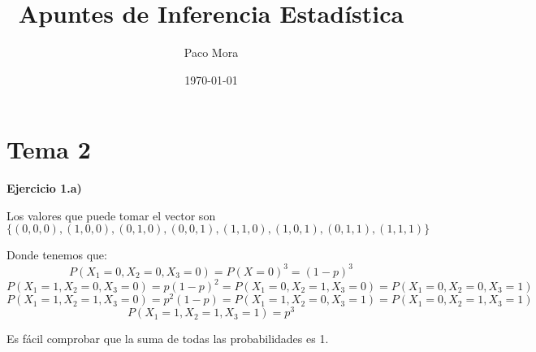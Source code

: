 \documentclass[openany]{book}
\title{Apuntes de Inferencia Estadística}
\author{Paco Mora}
\date{\today}
\begin{document}
\maketitle

\chapter{Tema 2}

\begin{exercise}
    \textbf{Ejercicio 1.a)}

    Los valores que puede tomar el vector son
    $$ \{(0,0,0),(1,0,0),(0,1,0),(0,0,1),(1,1,0),(1,0,1),(0,1,1),(1,1,1)\} $$

    Donde tenemos que:
    $$ P(X_1=0,X_2=0,X_3=0) = P(X=0)^3 = (1-p)^3 $$
    $$ P(X_1=1,X_2=0,X_3=0) = p(1-p)^2 = P(X_1=0,X_2=1,X_3=0) = P(X_1=0,X_2=0,X_3=1)$$
    $$ P(X_1=1,X_2=1,X_3=0) = p^2(1-p) = P(X_1=1,X_2=0,X_3=1) = P(X_1=0,X_2=1,X_3=1) $$
    $$ P(X_1=1,X_2=1,X_3=1) = p^3 $$

    Es fácil comprobar que la suma de todas las probabilidades es 1.

\end{exercise}
\end{document}

